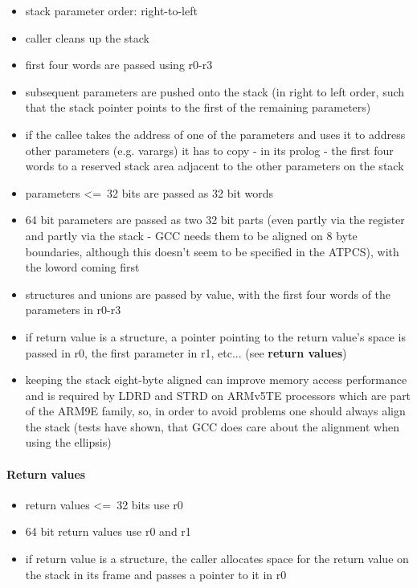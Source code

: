 \begin{itemize}
\item stack parameter order: right-to-left
\item caller cleans up the stack
\item first four words are passed using r0-r3
\item subsequent parameters are pushed onto the stack (in right to left order, such that the stack pointer points to the first of the remaining parameters)
\item if the callee takes the address of one of the parameters and uses it to address other parameters (e.g. varargs) it has to copy - in its prolog - the first four words to a reserved stack area adjacent to the other parameters on the stack
\item parameters \textless=\ 32 bits are passed as 32 bit words
\item 64 bit parameters are passed as two 32 bit parts (even partly via the register and partly via the stack - GCC needs them to be aligned on 8 byte boundaries, although this doesn't seem to be specified in the ATPCS), with the loword coming first
\item structures and unions are passed by value, with the first four words of the parameters in r0-r3
\item if return value is a structure, a pointer pointing to the return value's space is passed in r0, the first parameter in r1, etc... (see {\bf return values})
\item keeping the stack eight-byte aligned can improve memory access performance and is required by LDRD and STRD on ARMv5TE processors which are part of the ARM9E family, so, in order to avoid problems one should always align the stack (tests have shown, that GCC does care about the alignment when using the ellipsis)
\end{itemize}

\paragraph{Return values}
\begin{itemize}
\item return values \textless=\ 32 bits use r0
\item 64 bit return values use r0 and r1
\item if return value is a structure, the caller allocates space for the return value on the stack in its frame and passes a pointer to it in r0
\end{itemize}

